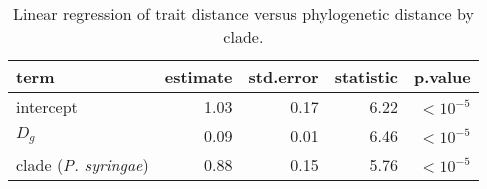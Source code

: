 \begin{table}[!ht]

\caption{\label{tab:}Linear regression of trait distance versus phylogenetic distance by clade.}
\centering
\begin{tabular}[t]{lrrrr}
\toprule
term & estimate & std.error & statistic & p.value\\
\midrule
intercept & 1.03 & 0.17 & 6.22 & $<10^{-5}$\\
$D_{g}$ & 0.09 & 0.01 & 6.46 & $<10^{-5}$\\
clade (\textit{P. syringae}) & 0.88 & 0.15 & 5.76 & $<10^{-5}$\\
\bottomrule
\end{tabular}
\end{table}
